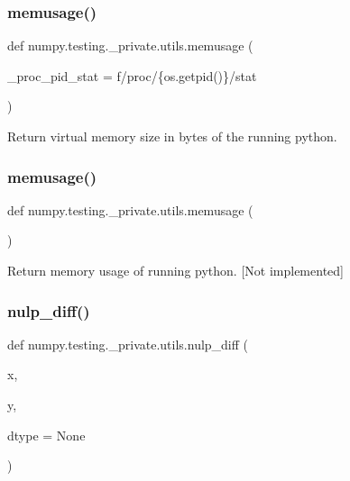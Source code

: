 \subsubsection{\texorpdfstring{memusage()}{memusage()}\hspace{0.1cm}{\footnotesize\ttfamily [2/3]}}
{\footnotesize\ttfamily def numpy.\+testing.\+\_\+private.\+utils.\+memusage (\begin{DoxyParamCaption}\item[{}]{\+\_\+proc\+\_\+pid\+\_\+stat = {\ttfamily f\textquotesingle{}/proc/\{os.getpid()\}/stat\textquotesingle{}} }\end{DoxyParamCaption})}

\begin{DoxyVerb}Return virtual memory size in bytes of the running python.\end{DoxyVerb}
 \mbox{\label{namespacenumpy_1_1testing_1_1__private_1_1utils_a6cae776794489e38592e1aa3fefe83cc}} 
\subsubsection{\texorpdfstring{memusage()}{memusage()}\hspace{0.1cm}{\footnotesize\ttfamily [3/3]}}
{\footnotesize\ttfamily def numpy.\+testing.\+\_\+private.\+utils.\+memusage (\begin{DoxyParamCaption}{ }\end{DoxyParamCaption})}

\begin{DoxyVerb}Return memory usage of running python. [Not implemented]\end{DoxyVerb}
 \mbox{\label{namespacenumpy_1_1testing_1_1__private_1_1utils_af91821dc1359818c781c899387e54815}} 
\subsubsection{\texorpdfstring{nulp\+\_\+diff()}{nulp\_diff()}}
{\footnotesize\ttfamily def numpy.\+testing.\+\_\+private.\+utils.\+nulp\+\_\+diff (\begin{DoxyParamCaption}\item[{}]{x,  }\item[{}]{y,  }\item[{}]{dtype = {\ttfamily None} }\end{DoxyParamCaption})}

